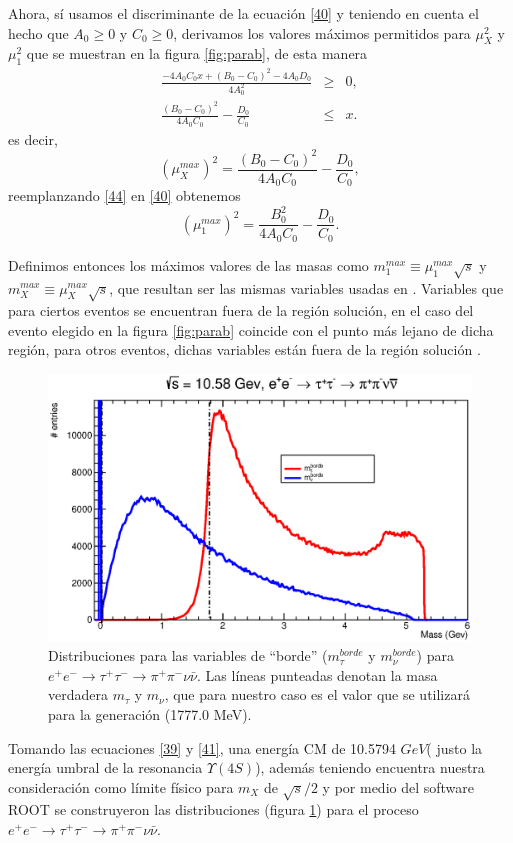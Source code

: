 Ahora, sí usamos el discriminante de la ecuación \ref{40} y teniendo en cuenta el hecho que \(A_0\geq 0\) y \(C_0\geq0\), derivamos los valores máximos permitidos para \(\mu_X^2\) y \(\mu_1^2\) que se muestran en la figura \ref{fig:parab}, de esta manera
\begin{eqnarray}
    \frac{-4A_0C_0x+(B_0-C_0)^2-4A_0D_0}{4A_0^2}&\geq&0,\\
    \frac{(B_0-C_0)^2}{4A_0C_0}-\frac{D_0}{C_0}&\leq&x.
\end{eqnarray}
es decir,
\begin{equation}
    (\mu_X^{max})^2 = \frac{(B_0-C_0)^2}{4A_0C_0}-\frac{D_0}{C_0},\label{44}
\end{equation}
reemplanzando \ref{44} en \ref{40} obtenemos
\begin{equation}
    (\mu_1^{max})^2 = \frac{B_0^2}{4A_0C_0}-\frac{D_0}{C_0}.
\end{equation}

Definimos entonces los máximos valores de las masas como \(m^{max}_1\equiv\mu^{max}_1\sqrt{s}\) y \(m^{max}_X\equiv\mu^{max}_X\sqrt{s}\), que resultan ser las mismas variables usadas en \cite{Harland-Lang:2012zen}. Variables que para ciertos eventos se encuentran fuera de la región solución, en el caso del evento elegido en la figura \ref{fig:parab} coincide con el punto más lejano de dicha región, para otros eventos, dichas variables están fuera de la región solución \cite{PhysRevD.95.075037}.


\begin{figure}[h]
    \centering
    \includegraphics[scale=.6]{Images/m_edge.eps}
    \caption{\small Distribuciones para las variables de ``borde'' (\(m_{\tau}^{borde}\) y \(m_{\nu}^{borde}\)) para \(e^+e^-\rightarrow\tau^+\tau^-\rightarrow\pi^+\pi^-\nu\bar{\nu}\). Las líneas punteadas denotan la masa verdadera \(m_{\tau}\) y \(m_{\nu}\), que para nuestro caso es el valor que se utilizará para la generación (1777.0 MeV).}
    \label{fig:masas}
\end{figure}
\newpage
Tomando las ecuaciones \ref{39} y \ref{41}, una energía CM de 10.5794 \(GeV\)( justo la energía umbral de la resonancia \(\Upsilon(4S)\)), además teniendo encuentra nuestra consideración como límite físico para \(m_X\) de \(\sqrt{s}/2\) y por medio del software ROOT se construyeron las distribuciones (figura \ref{fig:masas}) para el proceso  \(e^+e^-\rightarrow\tau^+\tau^-\rightarrow\pi^+\pi^-\nu\bar{\nu}\).

